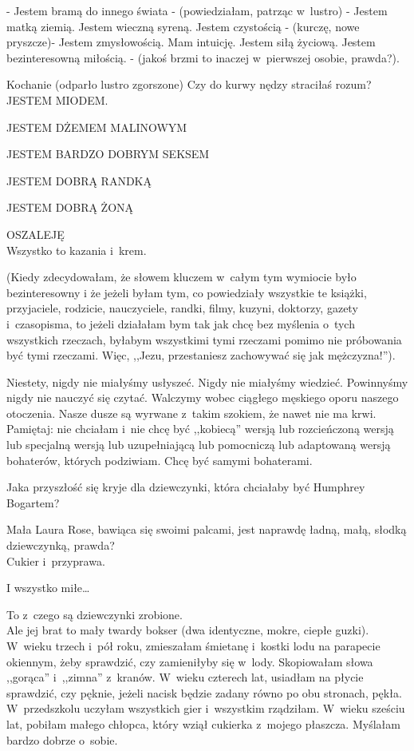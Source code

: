 \documentclass[oneside,polish,12pt,sfheadings]{mwbk}
\begin{document}
- Jestem bramą do innego świata - (powiedziałam, patrząc w~lustro)
- Jestem matką ziemią. Jestem wieczną syreną. Jestem czystością - (kurczę,
nowe pryszcze)- Jestem zmysłowością. Mam intuicję. Jestem siłą życiową.
Jestem bezinteresowną miłością. - (jakoś brzmi to inaczej w~pierwszej
osobie, prawda?).

Kochanie (odparło lustro zgorszone) Czy do kurwy nędzy straciłaś rozum?\\


JESTEM MIODEM.

JESTEM DŻEMEM MALINOWYM

JESTEM BARDZO DOBRYM SEKSEM

JESTEM DOBRĄ RANDKĄ

JESTEM DOBRĄ ŻONĄ

OSZALEJĘ\\

Wszystko to kazania i~krem.

(Kiedy zdecydowałam, że słowem kluczem w~całym tym wymiocie było bezinteresowny
i że jeżeli byłam tym, co powiedziały wszystkie te książki, przyjaciele,
rodzicie, nauczyciele, randki, filmy, kuzyni, doktorzy, gazety i~czasopisma,
to jeżeli działałam bym tak jak chcę bez myślenia o~tych wszystkich
rzeczach, byłabym wszystkimi tymi rzeczami pomimo nie próbowania
być tymi rzeczami. Więc, ,,Jezu, przestaniesz zachowywać się jak mężczyzna!'').

Niestety, nigdy nie miałyśmy usłyszeć. Nigdy nie miałyśmy wiedzieć.
Powinnyśmy nigdy nie nauczyć się czytać. Walczymy wobec ciągłego męskiego
oporu naszego otoczenia. Nasze dusze są wyrwane z~takim szokiem, że
nawet nie ma krwi. Pamiętaj: nie chciałam i~nie chcę być ,,kobiecą''
wersją lub rozcieńczoną wersją lub specjalną wersją lub uzupełniającą
lub pomocniczą lub adaptowaną wersją bohaterów, których podziwiam.
Chcę być samymi bohaterami.

Jaka przyszłość się kryje dla dziewczynki, która chciałaby być Humphrey
Bogartem?

Mała Laura Rose, bawiąca się swoimi palcami, jest naprawdę ładną,
małą, słodką dziewczynką, prawda?\\

Cukier i~przyprawa.

I wszystko miłe\ldots

To z~czego są dziewczynki zrobione.\\

Ale jej brat to mały twardy bokser (dwa identyczne, mokre, ciepłe
guzki). W~wieku trzech i~pół roku, zmieszałam śmietanę i~kostki lodu
na parapecie okiennym, żeby sprawdzić, czy zamieniłyby się w~lody.
Skopiowałam słowa ,,gorąca'' i~,,zimna'' z~kranów. W~wieku czterech
lat, usiadłam na płycie sprawdzić, czy pęknie, jeżeli nacisk będzie
zadany równo po obu stronach, pękła. W~przedszkolu uczyłam wszystkich
gier i~wszystkim rządziłam. W~wieku sześciu lat, pobiłam małego chłopca,
który wziął cukierka z~mojego płaszcza. Myślałam bardzo dobrze o~sobie.
\end{document}
